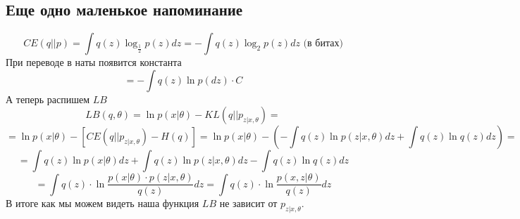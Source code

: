 \documentclass[10pt, a4paper]{extarticle}
\begin{document}
\subsection*{\textcolor{mypink1}{Еще одно маленькое напоминание}}
\[
CE(q||p) = \int q(z) \log_{\frac{1}{2}} p(z)dz = -\int q(z) \log_{2}p(z)dz \text{ (в битах)}
\]
При переводе в наты появится константа
\[
= - \int q(z) \ln p (dz) \cdot C
\]
А теперь распишем $LB$
\[
LB(q, \theta) = \ln p (x|\theta)  - KL(q || p_{z|x, \theta}) = 
\]
\[
= \ln p (x | \theta) - [CE(q||p_{z|x, \theta}) - H(q)] = \ln p(x|\theta) - (-\int q(z) \ln p(z|x, \theta)dz + \int q(z) \ln q(z)dz) = \]
\[
= \int q(z) \ln p(x|\theta)dz + \int q (z) \ln p(z|x, \theta)dz -  \int q(z) \ln q(z)dz
\]
\[
 = \int q(z) \cdot \ln \frac{p(x | \theta) \cdot p(z|x, \theta)}{q(z)}dz  =  \int q(z) \cdot \ln \frac{p(x, z | \theta)}{q(z)}dz
\]
В итоге как мы можем видеть наша функция $LB$ не зависит от $p_{z|x, \theta}$. \smiley
\end{document}
